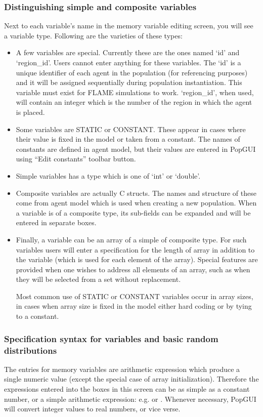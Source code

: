 \documentclass{article}
\begin{document}
\subsubsection{Distinguishing simple and composite variables}
Next to each variable's name in the memory variable editing screen, you will see a variable type. Following are the varieties of these types:
\begin{itemize}
  \item A few variables are special. Currently these are the ones named `id' and `region\_id'. Users cannot enter anything for these variables. The `id' is a unique identifier of each agent in the population (for referencing purposes) and it will be assigned sequentially during population instantiation. This variable must exist for FLAME simulations to work. `region\_id', when used, will contain an integer which is the number of the region in which the agent is placed.
  \item Some variables are STATIC or CONSTANT. These appear in cases where their value is fixed in the model or taken from a constant. The names of constants are defined in agent model, but their values are entered in PopGUI using ``Edit constants'' toolbar button.
  \item Simple variables has a type which is one of `int' or `double'.
  \item Composite variables are actually C structs. The names and structure of these come from agent model which is used when creating a new population. When a variable is of a composite type, its sub-fields can be expanded and will be entered in separate boxes.
  \item Finally, a variable can be an array of a simple of composite type. For such variables users will enter a specification for the length of array in addition to the variable (which is used for each element of the array). Special features are provided when one wishes to address all elements of an array, such as when they will be selected from a set without replacement.

Most common use of STATIC or CONSTANT variables occur in array sizes, in cases when array size is fixed in the model either hard coding or by tying to a constant.
\end{itemize}

\subsubsection{Specification syntax for variables and basic random distributions}
The entries for memory variables are arithmetic expression which produce a single numeric value (except the special case of array initialization). Therefore the expressions entered into the boxes in this screen can be as simple as a constant number, or a simple arithmetic expression: e.g.  or . Whenever necessary, PopGUI will convert integer values to real numbers, or vice verse.
\end{document}
